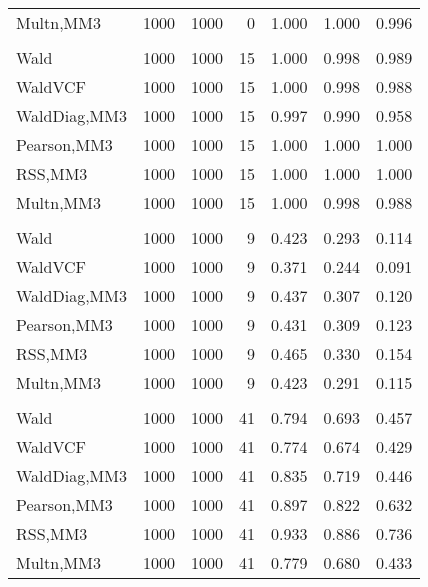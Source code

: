 \documentclass[
]{article}
\begin{document}
\begin{table}[H]
{\begin{tabular}[t]{lrrrrrr}
\hspace{1em}Multn,MM3 & 1000 & 1000 & 0 & 1.000 & 1.000 & 0.996\\
\addlinespace[0.3em]
\multicolumn{7}{l}{\textbf{1F 15V}}\\
\hspace{1em}Wald & 1000 & 1000 & 15 & 1.000 & 0.998 & 0.989\\
\hspace{1em}WaldVCF & 1000 & 1000 & 15 & 1.000 & 0.998 & 0.988\\
\hspace{1em}WaldDiag,MM3 & 1000 & 1000 & 15 & 0.997 & 0.990 & 0.958\\
\hspace{1em}Pearson,MM3 & 1000 & 1000 & 15 & 1.000 & 1.000 & 1.000\\
\hspace{1em}RSS,MM3 & 1000 & 1000 & 15 & 1.000 & 1.000 & 1.000\\
\hspace{1em}Multn,MM3 & 1000 & 1000 & 15 & 1.000 & 0.998 & 0.988\\
\addlinespace[0.3em]
\multicolumn{7}{l}{\textbf{2F 10V}}\\
\hspace{1em}Wald & 1000 & 1000 & 9 & 0.423 & 0.293 & 0.114\\
\hspace{1em}WaldVCF & 1000 & 1000 & 9 & 0.371 & 0.244 & 0.091\\
\hspace{1em}WaldDiag,MM3 & 1000 & 1000 & 9 & 0.437 & 0.307 & 0.120\\
\hspace{1em}Pearson,MM3 & 1000 & 1000 & 9 & 0.431 & 0.309 & 0.123\\
\hspace{1em}RSS,MM3 & 1000 & 1000 & 9 & 0.465 & 0.330 & 0.154\\
\hspace{1em}Multn,MM3 & 1000 & 1000 & 9 & 0.423 & 0.291 & 0.115\\
\addlinespace[0.3em]
\multicolumn{7}{l}{\textbf{3F 15V}}\\
\hspace{1em}Wald & 1000 & 1000 & 41 & 0.794 & 0.693 & 0.457\\
\hspace{1em}WaldVCF & 1000 & 1000 & 41 & 0.774 & 0.674 & 0.429\\
\hspace{1em}WaldDiag,MM3 & 1000 & 1000 & 41 & 0.835 & 0.719 & 0.446\\
\hspace{1em}Pearson,MM3 & 1000 & 1000 & 41 & 0.897 & 0.822 & 0.632\\
\hspace{1em}RSS,MM3 & 1000 & 1000 & 41 & 0.933 & 0.886 & 0.736\\
\hspace{1em}Multn,MM3 & 1000 & 1000 & 41 & 0.779 & 0.680 & 0.433\\
\bottomrule
\end{tabular}}
\endgroup{}
\end{table}
\end{document}
